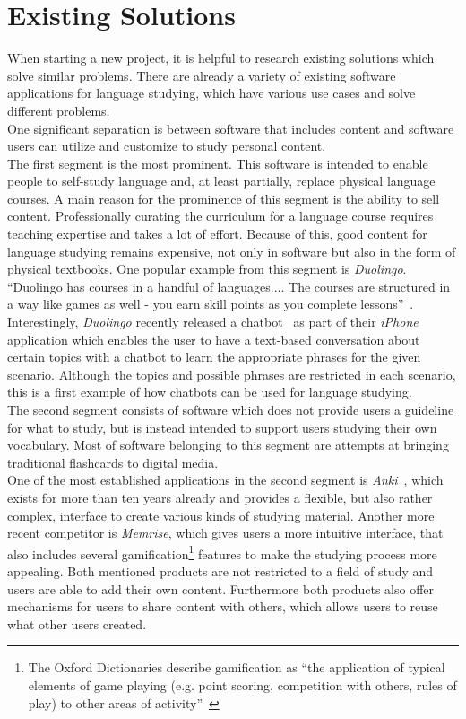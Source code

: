 \section{Existing Solutions}
\label{existing}


When starting a new project, it is helpful to research existing solutions which solve similar problems.
There are already a variety of existing software applications for language studying, which have various use cases and solve different problems.
\\
One significant separation is between software that includes content and software users can utilize and customize to study personal content.
\\

The first segment is the most prominent.
This software is intended to enable people to self-study language and, at least partially, replace physical language courses.
A main reason for the prominence of this segment is the ability to sell content.
Professionally curating the curriculum for a language course requires teaching expertise and takes a lot of effort.
Because of this, good content for language studying remains expensive, not only in software but also in the form of physical textbooks.
One popular example from this segment is \emph{Duolingo}. ``Duolingo has courses in a handful of languages.... The courses are structured in a way like games as well - you earn skill points as you complete lessons''~\cite{lifehacker}.
\\
Interestingly, \emph{Duolingo} recently released a chatbot~\cite{topbots2} as part of their \emph{iPhone} application which enables the user to have a text-based conversation about certain topics with a chatbot to learn the appropriate phrases for the given scenario.
Although the topics and possible phrases are restricted in each scenario, this is a first example of how chatbots can be used for language studying.
\\

The second segment consists of software which does not provide users a guideline for what to study, but is instead intended to support users studying their own vocabulary.
Most of software belonging to this segment are attempts at bringing traditional flashcards to digital media.
\\
One of the most established applications in the second segment is \emph{Anki}~\cite{lifehacker},
which exists for more than ten years already and provides a flexible,
but also rather complex, interface to create various kinds of studying material.
Another more recent competitor is \emph{Memrise}, which gives users a more intuitive interface, that also includes several gamification\footnote{The Oxford Dictionaries describe gamification as ``the application of typical elements of game playing (e.g. point scoring, competition with others, rules of play) to other areas of activity''~\cite{oxfordgamification}} features to make the studying process more appealing.
Both mentioned products are not restricted to a field of study and users are able to add their own content.
Furthermore both products also offer mechanisms for users to share content with others, which allows users to reuse what other users created.
\\

